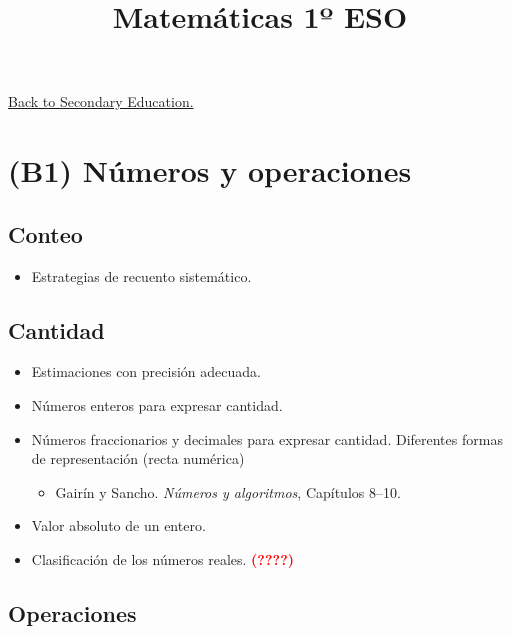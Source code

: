 \title{Matemáticas 1º ESO}

\href{/teaching/sec-teaching/}{ Back to Secondary Education.}

\maketitle

\section*{(B1) Números y operaciones}

\subsection*{Conteo}

\begin{itemize}
  \item Estrategias de recuento sistemático.
\end{itemize}

\subsection*{Cantidad}

\begin{itemize}
  \item Estimaciones con precisión adecuada.
  \item Números enteros para expresar cantidad.
  \item Números fraccionarios y decimales para expresar cantidad. Diferentes formas de representación (recta numérica)
  \begin{itemize}
    \item Gairín y Sancho. \emph{Números y algoritmos}, Capítulos 8--10.
  \end{itemize}
  \item Valor absoluto de un entero.
  \item Clasificación de los números reales. \textcolor{red}{\textbf{(????)}}
\end{itemize}

\subsection*{Operaciones}

